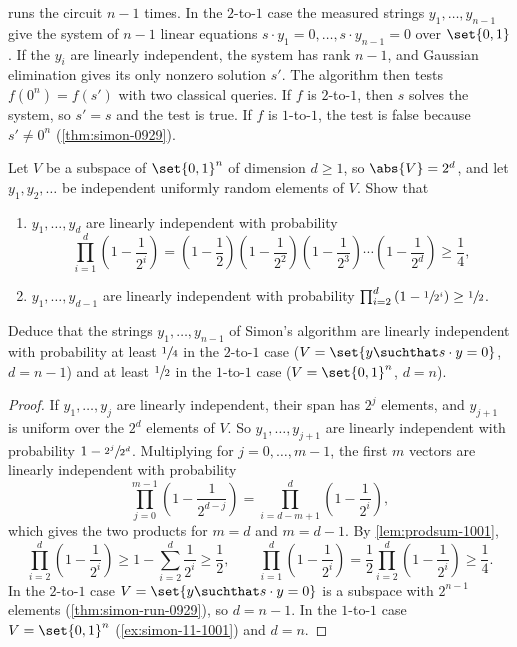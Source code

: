  runs the circuit $n - 1$ times. In the $2$-to-$1$ case the measured strings
$y_1, \dots, y_{n-1}$ give the system of $n - 1$ linear equations
$s \cdot y_1 = 0, \dots, s \cdot y_{n-1} = 0$ over $\set{0,1}$. If the $y_i$ are linearly independent,
the system has rank $n - 1$, and Gaussian elimination gives its only nonzero solution $s'$. The
algorithm then tests $f(0^n) = f(s')$ with two classical queries. If $f$ is $2$-to-$1$, then $s$
solves the system, so $s' = s$ and the test is true. If $f$ is $1$-to-$1$, the test is false because
$s' \neq 0^n$ (\cref{thm:simon-0929}).

\begin{exercisebox}
\begin{exercise}\label{ex:indep-1001}\label{thm:indep-1001}
    Let $V$ be a subspace of $\set{0,1}^n$ of dimension $d \geq 1$, so $\abs{V} = 2^d$, and let
    $y_1, y_2, \dots$ be independent uniformly random elements of $V$. Show that
    \begin{enumerate}
        \item $y_1, \dots, y_d$ are linearly independent with probability
              \[\prod_{i=1}^{d} \left(1 - \frac{1}{2^i}\right)
                  = \left(1 - \frac{1}{2}\right)\left(1 - \frac{1}{2^2}\right)\left(1 - \frac{1}{2^3}\right) \cdots \left(1 - \frac{1}{2^d}\right)
                  \geq \frac{1}{4},\]
        \item $y_1, \dots, y_{d-1}$ are linearly independent with probability
              $\prod_{i=2}^{d} \left(1 - \sfrac{1}{2^i}\right) \geq \sfrac{1}{2}$.
    \end{enumerate}
    Deduce that the strings $y_1, \dots, y_{n-1}$ of Simon's algorithm are linearly independent with
    probability at least $\sfrac{1}{4}$ in the $2$-to-$1$ case
    ($V = \set{y \suchthat s \cdot y = 0}$, $d = n - 1$) and at least $\sfrac{1}{2}$ in the
    $1$-to-$1$ case ($V = \set{0,1}^n$, $d = n$).
\end{exercise}
\tcblower
\begin{proof}
    If $y_1, \dots, y_j$ are linearly independent, their span has $2^j$ elements, and $y_{j+1}$ is
    uniform over the $2^d$ elements of $V$. So $y_1, \dots, y_{j+1}$ are linearly independent with
    probability $1 - \sfrac{2^j}{2^d}$. Multiplying for $j = 0, \dots, m-1$, the first $m$ vectors are
    linearly independent with probability
    \[\prod_{j=0}^{m-1} \left(1 - \frac{1}{2^{d-j}}\right) = \prod_{i=d-m+1}^{d} \left(1 - \frac{1}{2^i}\right),\]
    which gives the two products for $m = d$ and $m = d - 1$. By \cref{lem:prodsum-1001},
    \[\prod_{i=2}^{d} \left(1 - \frac{1}{2^i}\right) \geq 1 - \sum_{i=2}^{d} \frac{1}{2^i} \geq \frac{1}{2},
        \qquad
        \prod_{i=1}^{d} \left(1 - \frac{1}{2^i}\right) = \frac{1}{2} \prod_{i=2}^{d} \left(1 - \frac{1}{2^i}\right) \geq \frac{1}{4}.\]
    In the $2$-to-$1$ case $V = \set{y \suchthat s \cdot y = 0}$ is a subspace with $2^{n-1}$
    elements (\cref{thm:simon-run-0929}), so $d = n - 1$. In the $1$-to-$1$ case $V = \set{0,1}^n$
    (\cref{ex:simon-11-1001}) and $d = n$.
\end{proof}
\end{exercisebox}
